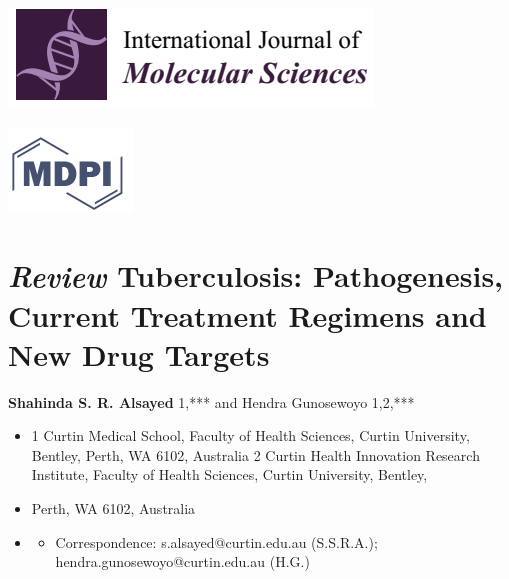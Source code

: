 \documentclass{article}
\begin{document}
\includegraphics{_page_0_Picture_0.png}



\includegraphics{_page_0_Picture_1.png}


\section{\textit{Review} \textbf{Tuberculosis: Pathogenesis, Current Treatment Regimens and New Drug Targets}}

\textbf{Shahinda S. R. Alsayed} 1,*** and Hendra Gunosewoyo 1,2,***
\begin{itemize}
\item 
1 Curtin Medical School, Faculty of Health Sciences, Curtin University, Bentley, Perth, WA 6102, Australia 2 Curtin Health Innovation Research Institute, Faculty of Health Sciences, Curtin University, Bentley,

\item 
Perth, WA 6102, Australia

\item \begin{itemize}
\item 
Correspondence: s.alsayed@curtin.edu.au (S.S.R.A.); hendra.gunosewoyo@curtin.edu.au (H.G.)

\end{itemize}

\end{itemize}
\end{document}
